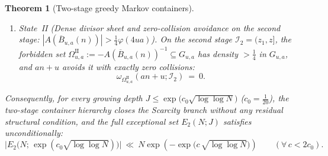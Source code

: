 \documentclass[11pt, a4paper]{article}
\theoremstyle{plain}
\newtheorem{theorem}{Theorem}[section]
\theoremstyle{definition}
\begin{document}
\begin{theorem}[Two-stage greedy Markov containers]
\begin{enumerate}[label=(\roman*)]
    \item \emph{State~II (Dense divisor sheet and zero-collision avoidance on the second stage: $|A(\overline{B}_{u,a}(n))|>\frac14\varphi(4ua)$).} 
    On the second stage $\mathcal{I}_2=(z_1,z]$, the forbidden set $\Omega_{u,a}^{\mathrm{II}}:=-A(\overline{B}_{u,a}(n))^{-1}\subseteq G_{u,a}$ has density $>\frac14$ in $G_{u,a}$, and $an+u$ avoids it with \emph{exactly zero collisions}:
    \begin{equation}\label{eq:state2_zero_collisions}
    \omega_{\Omega_{u,a}^{\mathrm{II}}}(an+u;\mathcal{I}_2)\ =\ 0.
    \end{equation}
\end{enumerate}
Consequently, for every growing depth $J\le\exp\big(c_0\sqrt{\log\log N}\big)$ ($c_0=\frac{1}{20}$), the two-stage container hierarchy closes the Scarcity branch without any residual structural condition, and the full exceptional set $E_2(N;J)$ satisfies unconditionally:
\begin{equation}\label{eq:super_polylog_unconditional_bound}
\big|E_2\big(N;\,\exp(c_0\sqrt{\log\log N})\big)\big|\ \ll\ N\exp\!\left(-\exp\!\Big(c\,\sqrt{\log\log N}\Big)\right)\qquad(\forall\,c<2c_0).
\end{equation}
\end{theorem}
\end{document}
